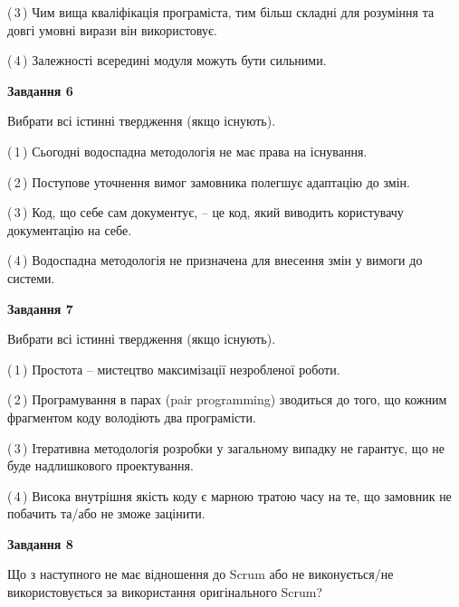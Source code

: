 \documentclass[10pt, ukrainian]{article}
\begin{document}
{\begin {large}
(\,3\,) Чим вища кваліфікація програміста, тим більш складні для розуміння та довгі умовні вирази він використовує. %



(\,4\,) Залежності всередині модуля можуть бути сильними. %

\newpage

{\begin {center}\textbf{Завдання 6}\end {center}}\par
Вибрати всі істинні твердження (якщо існують).\par
\vspace{2mm}



(\,1\,) Сьогодні водоспадна методологія не має права на існування. %



(\,2\,) Поступове уточнення вимог замовника полегшує адаптацію до змін. %



(\,3\,) Код, що себе сам документує, -- це код, який виводить користувачу документацію на себе. %



(\,4\,) Водоспадна методологія не призначена для внесення змін у вимоги до системи. %


{\begin {center}\textbf{Завдання 7}\end {center}}\par
Вибрати всі істинні твердження (якщо існують).\par
\vspace{2mm}



(\,1\,) Простота – мистецтво максимізації незробленої роботи. %



(\,2\,) Програмування в парах (pair programming) зводиться до того, що кожним фрагментом коду володіють два програмісти. %



(\,3\,) Ітеративна методологія розробки у загальному випадку не гарантує, що не буде надлишкового проектування. %



(\,4\,) Висока внутрішня якість коду є марною тратою часу на те, що замовник не побачить та/або не зможе зацінити. %


{\begin {center}\textbf{Завдання 8}\end {center}}\par
Що з наступного не має відношення до Scrum або не виконується/не використовується за використання оригінального Scrum?\par
\vspace{2mm}




\end{large}}
\end{document}
